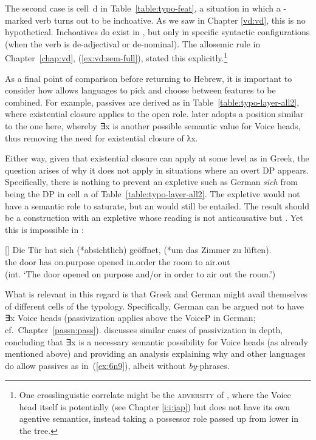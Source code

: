 \begin{exe}
\begin{xlist}
\begin{exe}
\begin{exe}
\begin{xlist}
\begin{exe}
\begin{exe}
\begin{exe}
\begin{exe}
\begin{exe}
\begin{xlist}
The second case is cell~d in Table~\ref{table:typo-feat}, a situation in which a -marked verb turns out to be inchoative. As we saw in Chapter \ref{vd:vd}, this is no hypothetical. Inchoatives do exist in {\thif}, but only in specific syntactic configurations (when the verb is de-adjectival or de-nominal). The allosemic rule in Chapter~\ref{chap:vd}, (\ref{ex:vd:sem-full}), stated this explicitly.\footnote{One crosslinguistic correlate might be the \textsc{adversity } of  \citep{pylkkanen08,woodmarantz17}, where the Voice head itself is potentially {\vd} (see Chapter \ref{i:i:jap}) but does not have its own agentive semantics, instead taking a possessor role passed up from lower in the tree.}

As a final point of comparison before returning to Hebrew, it is important to consider how  allows languages to pick and choose between features to be combined. For example,  passives are derived as in Table~\ref{table:typo-layer-all2}, where existential closure applies to the open  role. \cite{schaefer17oup} later adopts a position similar to the one here, whereby ∃x is another possible semantic value for Voice heads, thus removing the need for existential closure of λx. 

Either way, given that existential closure can apply at some level as in Greek, the question arises of why it does not apply in situations where an overt DP appears. Specifically, there is nothing to prevent an expletive such as German \emph{sich} from being the DP in cell~a of Table~\ref{table:typo-layer-all2}. The expletive would not have a semantic role to saturate, but an  would still be entailed. The result should be a construction with an expletive whose reading is not anticausative but . Yet this is impossible in :
 \begin{exe}
\ex   \label{ex:6n9}
[] 	{ \gll Die T\"ur hat sich (*absichtlich) ge\"offnet, (*um das Zimmer zu l\"uften).\\
 	  the door has  \phantom{(*}on.purpose opened \phantom{(*}in.order the room to air.out\\
 	\glt (int. `The door opened on purpose and/or in order to air out the room.') } 
	
 \z 

What is relevant in this regard is that Greek and German might avail themselves of different cells of the typology. Specifically, German can be argued not to have ∃x Voice heads (passivization applies above the VoiceP in German; cf.~Chapter~\ref{passn:pass}). \cite{schaefer17oup} discusses similar cases of passivization in depth, concluding that ∃x is a necessary semantic possibility for Voice heads (as already mentioned above) and providing an analysis explaining why  and other languages do allow passives as in~(\ref{ex:6n9}), albeit without \emph{by}-phrases. 


\end{exe}
\end{xlist}
\end{exe}
\end{exe}
\end{exe}
\end{exe}
\end{exe}
\end{xlist}
\end{exe}
\end{exe}
\end{xlist}
\end{exe}
